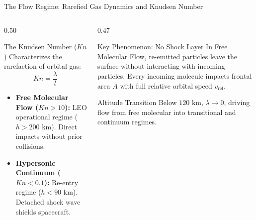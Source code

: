 \documentclass[aspectratio=169,11pt]{beamer}
\begin{document}
\begin{frame}{The Flow Regime: Rarefied Gas Dynamics and Knudsen Number}
    \begin{columns}[t]
        \begin{column}{0.50\textwidth}
            \begin{block}{The Knudsen Number ($Kn$)}
                \small
                Characterizes the rarefaction of orbital gas:
                {\small
                \begin{equation*}
                    Kn = \frac{\lambda}{l}
                \end{equation*}
                }
                \vspace{-0.3cm}
                \begin{itemize}\setlength{\itemsep}{1pt}
                    \item \textbf{Free Molecular Flow ($Kn > 10$):} LEO operational regime ($h > 200\text{ km}$). Direct impacts without prior collisions.
                    \item \textbf{Hypersonic Continuum ($Kn < 0.1$):} Re-entry regime ($h < 90\text{ km}$). Detached shock wave shields spacecraft.
                \end{itemize}
            \end{block}
        \end{column}

        \begin{column}{0.47\textwidth}
            \begin{exampleblock}{Key Phenomenon: No Shock Layer}
                \small
                In Free Molecular Flow, re-emitted particles leave the surface without interacting with incoming particles. Every incoming molecule impacts frontal area $A$ with full relative orbital speed $v_{\text{rel}}$.
            \end{exampleblock}
            \vspace{-0.1cm}
            \begin{alertblock}{Altitude Transition}
                \small
                Below $120\text{ km}$, $\lambda \to 0$, driving flow from free molecular into transitional and continuum regimes.
            \end{alertblock}
        \end{column}
    \end{columns}
\end{frame}
\end{document}
